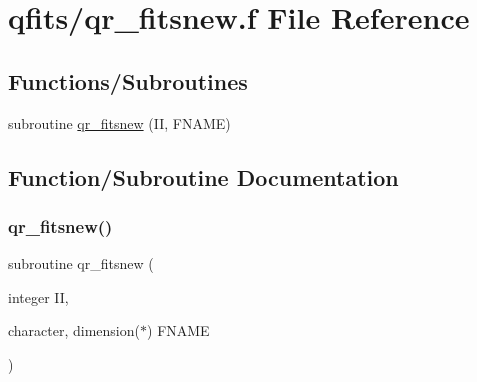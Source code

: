 \hypertarget{qr__fitsnew_8f}{}\section{qfits/qr\+\_\+fitsnew.f File Reference}
\label{qr__fitsnew_8f}
\subsection*{Functions/\+Subroutines}
\begin{DoxyCompactItemize}
\item 
subroutine \hyperlink{qr__fitsnew_8f_ad4cba30be14401e690aba732ea186c6d}{qr\+\_\+fitsnew} (II, F\+N\+A\+ME)
\end{DoxyCompactItemize}


\subsection{Function/\+Subroutine Documentation}
\mbox{\label{qr__fitsnew_8f_ad4cba30be14401e690aba732ea186c6d}} 
\subsubsection{\texorpdfstring{qr\+\_\+fitsnew()}{qr\_fitsnew()}}
{\footnotesize\ttfamily subroutine qr\+\_\+fitsnew (\begin{DoxyParamCaption}\item[{integer}]{II,  }\item[{character, dimension($\ast$)}]{F\+N\+A\+ME }\end{DoxyParamCaption})}

